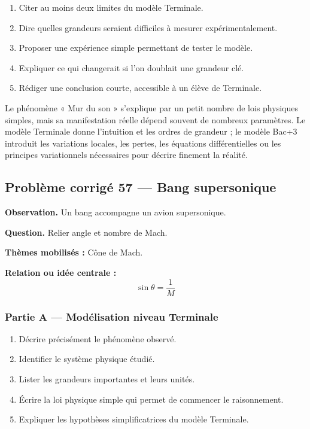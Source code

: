 \documentclass[11pt,a4paper]{article}
\begin{document}
\begin{enumerate}
  \item Citer au moins deux limites du modèle Terminale.
  \item Dire quelles grandeurs seraient difficiles à mesurer expérimentalement.
  \item Proposer une expérience simple permettant de tester le modèle.
  \item Expliquer ce qui changerait si l'on doublait une grandeur clé.
  \item Rédiger une conclusion courte, accessible à un élève de Terminale.
\end{enumerate}

\begin{corrigebox}
Le phénomène « Mur du son » s'explique par un petit nombre de lois physiques simples, mais sa manifestation réelle dépend souvent de nombreux paramètres. Le modèle Terminale donne l'intuition et les ordres de grandeur ; le modèle Bac+3 introduit les variations locales, les pertes, les équations différentielles ou les principes variationnels nécessaires pour décrire finement la réalité.
\end{corrigebox}

\subsection{Problème corrigé 57 — Bang supersonique}

\begin{exercicebox}
\textbf{Observation.} Un bang accompagne un avion supersonique.

\medskip
\textbf{Question.} Relier angle et nombre de Mach.

\medskip
\textbf{Thèmes mobilisés :} Cône de Mach.

\medskip
\textbf{Relation ou idée centrale :}
\[
\sin\theta=\frac1M
\]
\end{exercicebox}

\subsubsection*{Partie A — Modélisation niveau Terminale}

\begin{enumerate}
  \item Décrire précisément le phénomène observé.
  \item Identifier le système physique étudié.
  \item Lister les grandeurs importantes et leurs unités.
  \item Écrire la loi physique simple qui permet de commencer le raisonnement.
  \item Expliquer les hypothèses simplificatrices du modèle Terminale.
\end{enumerate}
\end{document}
